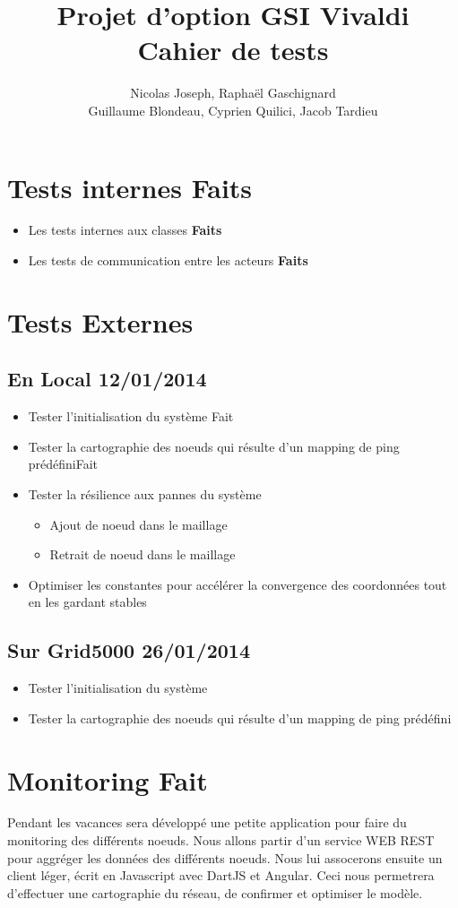 \documentclass[11pt,a4paper]{article}
\title{Projet d'option GSI Vivaldi \\ Cahier de tests}
\author{Nicolas Joseph, Raphaël Gaschignard\\ Guillaume Blondeau, Cyprien Quilici, Jacob Tardieu}
\begin{document}
\maketitle

\section{Tests internes \hfill Faits}
\begin{itemize}
\item Les tests internes aux classes  \hfill \textbf{Faits}
\item Les tests de communication entre les acteurs \hfill \textbf{Faits}
\end{itemize}

\section{Tests Externes}
\subsection{En Local \hfill \textbf{12/01/2014}}

\begin{itemize}
\item Tester l’initialisation du système \hfill Fait
\item Tester la cartographie des noeuds qui résulte d’un mapping de ping prédéfini\hfill Fait
\item Tester la résilience aux pannes du système
\begin{itemize}
\item Ajout de noeud dans le maillage
\item Retrait de noeud dans le maillage
\end{itemize}
\item Optimiser les constantes pour accélérer la convergence des coordonnées tout en les gardant stables
\end{itemize}

\subsection{Sur Grid5000  \hfill \textbf{26/01/2014}}
\begin{itemize}
\item Tester l’initialisation du système
\item Tester la cartographie des noeuds qui résulte d’un mapping de ping prédéfini
\end{itemize}

\section{Monitoring \hfill Fait}
Pendant les vacances sera développé une petite application pour faire du monitoring des différents noeuds. Nous allons partir d'un service WEB REST pour aggréger les données des différents noeuds. Nous lui assocerons ensuite un client léger, écrit en Javascript avec DartJS et Angular. Ceci nous permetrera d'effectuer une cartographie du réseau, de confirmer et optimiser le modèle.
\end{document}
